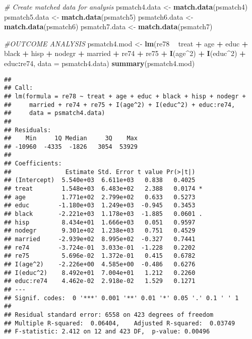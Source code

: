\documentclass[]{article}
\newenvironment{Shaded}{\begin{snugshade}}{\end{snugshade}}
\newcommand{\CommentTok}[1]{\textcolor[rgb]{0.56,0.35,0.01}{\textit{#1}}}
\newcommand{\DataTypeTok}[1]{\textcolor[rgb]{0.13,0.29,0.53}{#1}}
\newcommand{\DecValTok}[1]{\textcolor[rgb]{0.00,0.00,0.81}{#1}}
\newcommand{\KeywordTok}[1]{\textcolor[rgb]{0.13,0.29,0.53}{\textbf{#1}}}
\newcommand{\NormalTok}[1]{#1}
\newcommand{\OperatorTok}[1]{\textcolor[rgb]{0.81,0.36,0.00}{\textbf{#1}}}
\newcommand{\StringTok}[1]{\textcolor[rgb]{0.31,0.60,0.02}{#1}}
\begin{document}
\begin{Shaded}
\begin{Highlighting}[]
\CommentTok{# Create matched data for analysis}
\NormalTok{psmatch4.data <-}\StringTok{ }\KeywordTok{match.data}\NormalTok{(psmatch4)}
\NormalTok{psmatch5.data <-}\StringTok{ }\KeywordTok{match.data}\NormalTok{(psmatch5)}
\NormalTok{psmatch6.data <-}\StringTok{ }\KeywordTok{match.data}\NormalTok{(psmatch6)}
\NormalTok{psmatch7.data <-}\StringTok{ }\KeywordTok{match.data}\NormalTok{(psmatch7)}

\CommentTok{#OUTCOME ANALYSIS}
\NormalTok{psmatch4.mod <-}\StringTok{ }\KeywordTok{lm}\NormalTok{(re78 }\OperatorTok{~}\StringTok{ }\NormalTok{treat }\OperatorTok{+}\StringTok{ }\NormalTok{age }\OperatorTok{+}\StringTok{ }\NormalTok{educ }\OperatorTok{+}\StringTok{ }\NormalTok{black }\OperatorTok{+}\StringTok{ }\NormalTok{hisp }\OperatorTok{+}\StringTok{ }\NormalTok{nodegr }\OperatorTok{+}\StringTok{ }\NormalTok{married }\OperatorTok{+}\StringTok{ }\NormalTok{re74 }\OperatorTok{+}\StringTok{ }\NormalTok{re75 }\OperatorTok{+}\StringTok{ }
\StringTok{                     }\KeywordTok{I}\NormalTok{(age}\OperatorTok{^}\DecValTok{2}\NormalTok{) }\OperatorTok{+}\StringTok{ }\KeywordTok{I}\NormalTok{(educ}\OperatorTok{^}\DecValTok{2}\NormalTok{) }\OperatorTok{+}\StringTok{ }\NormalTok{educ}\OperatorTok{:}\NormalTok{re74, }
                   \DataTypeTok{data =}\NormalTok{ psmatch4.data)}
\KeywordTok{summary}\NormalTok{(psmatch4.mod)}
\end{Highlighting}
\end{Shaded}

\begin{verbatim}
## 
## Call:
## lm(formula = re78 ~ treat + age + educ + black + hisp + nodegr + 
##     married + re74 + re75 + I(age^2) + I(educ^2) + educ:re74, 
##     data = psmatch4.data)
## 
## Residuals:
##    Min     1Q Median     3Q    Max 
## -10960  -4335  -1826   3054  53929 
## 
## Coefficients:
##               Estimate Std. Error t value Pr(>|t|)  
## (Intercept)  5.540e+03  6.611e+03   0.838   0.4025  
## treat        1.548e+03  6.483e+02   2.388   0.0174 *
## age          1.771e+02  2.799e+02   0.633   0.5273  
## educ        -1.180e+03  1.249e+03  -0.945   0.3453  
## black       -2.221e+03  1.178e+03  -1.885   0.0601 .
## hisp         8.434e+01  1.666e+03   0.051   0.9597  
## nodegr       9.301e+02  1.238e+03   0.751   0.4529  
## married     -2.939e+02  8.995e+02  -0.327   0.7441  
## re74        -3.724e-01  3.033e-01  -1.228   0.2202  
## re75         5.696e-02  1.372e-01   0.415   0.6782  
## I(age^2)    -2.226e+00  4.585e+00  -0.486   0.6276  
## I(educ^2)    8.492e+01  7.004e+01   1.212   0.2260  
## educ:re74    4.462e-02  2.918e-02   1.529   0.1271  
## ---
## Signif. codes:  0 '***' 0.001 '**' 0.01 '*' 0.05 '.' 0.1 ' ' 1
## 
## Residual standard error: 6558 on 423 degrees of freedom
## Multiple R-squared:  0.06404,    Adjusted R-squared:  0.03749 
## F-statistic: 2.412 on 12 and 423 DF,  p-value: 0.00496
\end{verbatim}
\end{document}
